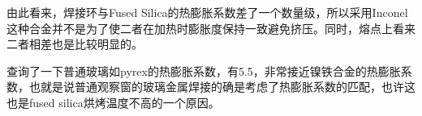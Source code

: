 \documentclass[onecolumn,a4paper,10pt]{article}
\begin{document}
由此看来，焊接环与Fused Silica的热膨胀系数差了一个数量级，所以采用Inconel这种合金并不是为了使二者在加热时膨胀度保持一致避免挤压。同时，熔点上看来二者相差也是比较明显的。

查询了一下普通玻璃如pyrex的热膨胀系数，有5.5，非常接近镍铁合金的热膨胀系数，也就是说普通观察窗的玻璃金属焊接的确是考虑了热膨胀系数的匹配，也许这也是fused silica烘烤温度不高的一个原因。

\begin{comment}
\newpage
\section{关于Diffusion Bond}
查看了一下各种公司的产品目录以及UKAEA告知我们的一些情况，观察窗中大部分的金属与玻璃之间的焊接应该是使用Diffusion Bond技术完成的，以下是维基百科的介绍：
\\
\\
\emph{\textbf{\large{Diffusion bonding is a solid-state welding technique used in metalworking, capable of joining similar and dissimilar metals. It operates on the materials science principle of solid-state diffusion, wherein the atoms of two solid, metallic surfaces intermingle over time under elevated temperature. Diffusion bonding is typically implemented by applying both high pressure and high temperature to the materials to be welded; it is most commonly used to weld "sandwiches" of alternating layers of thin metal foil and metal wires or filaments.}}}
\\
\\
可见，这个技术利用的是不同材料之间的原子扩散实现接合，这个过程中需要高温高压提高原子的扩散速度，同时，材料的接触面必须接触紧密，这就要求表面足够光滑。\\
\\
\emph{\textbf{\large{Diffusion bonding is performed by clamping the two pieces to be welded with their surfaces abutting each other. Prior to welding, these surfaces must be machined to as smooth a finish as economically viable, and kept as free from chemical contaminants or other detritus as possible. Any intervening material between the two metallic surfaces may prevent adequate diffusion of material. Once clamped, pressure and heat are applied to the components, usually for many hours.\\At the microscopic level, diffusion bonding occurs in three simplified stages:\\\\
Before the surfaces completely contact, asperities (very small surface defects) on the two surfaces contact at the microscopic level and plastically deform. As these asperities deform, they interlink forming interfaces between the two surfaces.\\\\Elevated temperature and pressure causes accelerated creep in the materials; grain boundaries and raw material migrate and gaps between the two surfaces are reduced to isolated pores.\\\\Material begins to diffuse across the boundary of the abutting surfaces, confusing this boundary and creating a bond.}}}

\end{comment}
\end{document}
